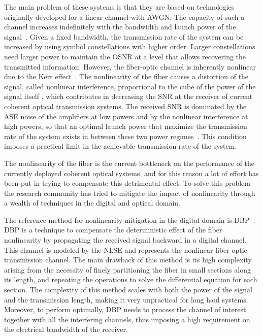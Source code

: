 The main problem of these systems is that they are based on technologies
originally developed for a linear channel
with \ac{AWGN}. The capacity of such a channel increases indefinitely with the
bandwidth and launch power of the signal~\cite{shannon1948mathematical}. Given a
fixed bandwidth, the transmission rate of the system can be increased by using
symbol constellations with higher order.  Larger constellations need larger power to maintain the \ac{OSNR} at a level that allows recovering the transmitted information. However, the fiber-optic channel is
inherently nonlinear due to the Kerr effect~\cite{Agrawal12_NonlinearFOs_Book}.
The nonlinearity of the fiber causes a distortion of  the signal, called
nonlinear interference, proportional to the cube of the power of the
signal itself \cite{poggiolini2012gn}, which contributes in decreasing the \ac{SNR} at the
receiver of current coherent optical transmission systems. The received  \ac{SNR} is
dominated by the \ac{ASE} noise of the amplifiers at low powers and by the
nonlinear interference at high powers, so that an optimal launch power that
maximize the transmission rate of the system exists in between these two power
regimes~\cite{Mitra, Essiambre, mecozzi2012nonlinear}. This condition imposes a practical limit in the achievable transmission rate of the system.

The nonlinearity of the fiber is the current bottleneck on the performance of  the currently deployed coherent optical systems, and for this reason a lot of effort has been put in trying to
compensate this detrimental effect.
To solve this problem the research community has tried to mitigate the impact of nonlinearity through a wealth of techniques in the digital and optical domain.

The reference method for nonlinearity mitigation in the digital domain is
\ac{DBP}~\cite{Ip,dar2017nonlinear}. \ac{DBP} is a technique to compensate  the
deterministic effect of the fiber nonlinearity by propagating the received signal
backward in a digital channel. This channel is modeled by the \ac{NLSE} and represents the nonlinear fiber-optic transmission channel.
The main drawback of this method is its high complexity arising from the
necessity of finely partitioning the fiber in small sections along its length, and repeating the operations
to solve the differential equation for each section. The complexity of this
method scales with both the power of the signal and the transmission length,
making it very unpractical for long haul systems. Moreover, to perform optimally, \ac{DBP} needs to process the channel of interest together with all the interfering channels, thus imposing a high requirement on the electrical bandwidth of the receiver.

